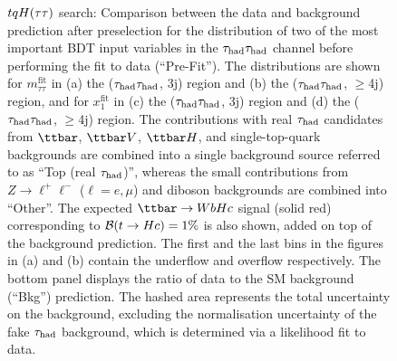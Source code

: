 \begin{figure}[t]
\begin{center}
\caption{$tqH(\tau\tau)$ search: Comparison between the data and background prediction after preselection for the distribution of two of the most 
important BDT input variables in the $\tau_{\mathrm{had}} \tau_{\mathrm{had}}$ channel before performing the fit to data (``Pre-Fit''). The distributions are shown for
$m_{\tau\tau}^{\text{fit}}$ in (a) the ($\tau_{\mathrm{had}} \tau_{\mathrm{had}}$, 3j) region and (b) the ($\tau_{\mathrm{had}} \tau_{\mathrm{had}}$, $\geq$4j) region, and for
$x_{1}^{\text{fit}}$ in (c) the ($\tau_{\mathrm{had}} \tau_{\mathrm{had}}$, 3j)  region and (d) the ($\tau_{\mathrm{had}} \tau_{\mathrm{had}}$, $\geq$4j) region.
The contributions with real $\tau_{\mathrm{had}}$ candidates from $\ttbar$,  $\ttbar V$, $\ttbar H$, and single-top-quark backgrounds are combined into
a single background source referred to as ``Top (real $\tau_{\mathrm{had}}$)'', whereas the small contributions from 
$Z\to \ell^+\ell^-$ ($\ell = e, \mu$) and diboson backgrounds are combined into ``Other''. 
The expected $\Hc$ signal (solid red) corresponding to $\mathcal{B}(t\to Hc)=1\%$ is also shown,
added on top of the background prediction.
The first and the last bins in the figures in (a) and (b) contain the underflow and overflow respectively.
The bottom panel displays the ratio of data to the SM background (``Bkg'') prediction.
The hashed area represents the total uncertainty on the background, excluding the normalisation uncertainty of the fake $\tau_{\mathrm{had}}$ background, 
which is determined via a likelihood fit to data.} 
\label{fig:BDT_inputs_hadhad}
\end{center}
\end{figure}

